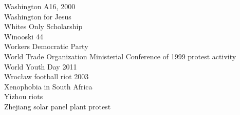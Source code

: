 Washington A16, 2000\\
Washington for Jesus\\
Whites Only Scholarship\\
Winooski 44\\
Workers Democratic Party\\
World Trade Organization Ministerial Conference of 1999 protest activity\\
World Youth Day 2011\\
Wrocław football riot 2003\\
Xenophobia in South Africa\\
Yizhou riots\\
Zhejiang solar panel plant protest\\
